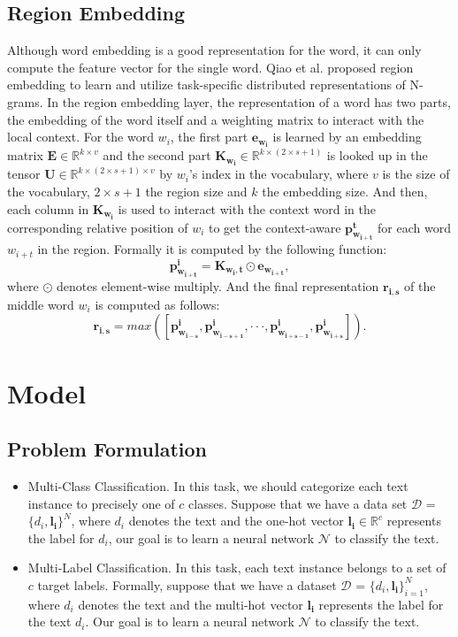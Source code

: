 \documentclass[letterpaper]{article} %
\begin{document}
\subsection{Region Embedding}
Although word embedding is a good representation for the word, it can only compute the feature vector for the single word. Qiao et al.  proposed region embedding to learn and utilize task-specific distributed representations of N-grams. In the region embedding layer, the representation of a word has two
parts, the embedding of the word itself and a weighting matrix to interact with the local context. For the word $w_{i}$, the first part $\mathbf{e_{w_{i}}}$ is learned by an embedding matrix $\mathbf{E} \in \mathbb{R}^{k \times v}$ and the second part $\mathbf{K_{w_{i}}} \in \mathbb{R}^{k\times(2\times s+1)}$ is looked up in the tensor $\mathbf{U} \in \mathbb{R}^{k\times(2 \times s + 1)\times v}$ by $w_{i}$'s index in the vocabulary, where $v$ is the size of the vocabulary, $2 \times s + 1$ the region size and $k$ the embedding size. And then, each column in $\mathbf{K_{w_{i}}}$ is used to interact with the context word in the corresponding relative position of $w_{i}$ to get the context-aware $\mathbf{p^{t}_{w_{i+t}}}$ for each word $w_{i+t}$ in the region. Formally it is computed by the following function:
\begin{equation}
\mathbf{p^{i}_{w_{i+t}} = K_{w_{i},t} \odot \mathbf{e_{w_{i+t}}}},
\end{equation}
where $\odot$ denotes element-wise multiply.
And the final representation $\mathbf{r_{i,s}}$ of the middle word $w_{i}$ is computed as follows:
\begin{equation}
\mathbf{r_{i,s}} = max\mathbf{([p^{i}_{w_{i-s}}, p^{i}_{w_{i-s+1}}, \cdot \cdot \cdot, p^{i}_{w_{i+s-1}}, p^{i}_{w_{i+s}}])}.
\end{equation}

\section{Model}
\subsection{Problem Formulation}
\begin{itemize}
\item Multi-Class Classification. 
In this task, we should categorize each text instance to precisely one of $c$ classes. Suppose that we have a data set $\mathcal{D}$ = $\{d_{i},\mathbf{l_{i}}\}^{N}$, where $d_{i}$ denotes the text and the one-hot vector $\mathbf{l_{i}} \in \mathbb{R}^{c}$ represents the label for $d_{i}$, our goal is to learn a neural network $\mathcal{N}$ to classify the text.
\item Multi-Label Classification. 
In this task, each text instance belongs to a set of $c$ target labels. Formally, suppose that we have a dataset $\mathcal{D}$ = $\{d_{i},\mathbf{l_{i}}\}_{i=1}^{N}$, where $d_{i}$ denotes the text and the multi-hot vector $\mathbf{l_{i}}$ represents the label for the text $d_{i}$. Our goal is to learn a neural network $\mathcal{N}$ to classify the text. 
\end{itemize}
\end{document}
